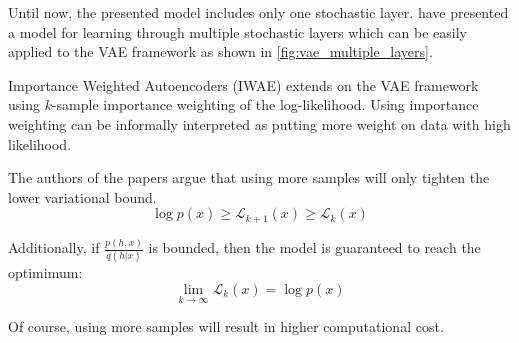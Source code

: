 Until now, the presented model includes only one stochastic layer.
\cite{dlgm:2014} have presented a model for learning through multiple stochastic layers which can be easily applied to the VAE framework as shown in \ref{fig:vae_multiple_layers}.


Importance Weighted Autoencoders (IWAE) extends on the VAE framework using $k$-sample importance weighting of the log-likelihood.
Using importance weighting can be informally interpreted as putting more weight on data with high likelihood.

The authors of the papers argue that using more samples will only tighten the lower variational bound.
$$
\log p(x) \geq \mathcal{L}_{k+1}(x) \geq \mathcal{L}_{k}(x)
$$

Additionally, if $\frac{p(h,x)}{q(h|x)}$ is bounded, then the model is guaranteed to reach the optimimum:
$$
\lim_{k \rightarrow \infty} \mathcal{L}_{k}(x) = \log p(x)
$$

Of course, using more samples will result in higher computational cost.

\vspace{5cm}
